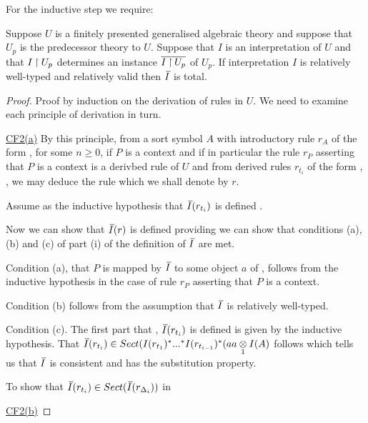 For the inductive step we require:
\begin{lemma}
Suppose $U$ is a finitely presented generalised algebraic theory and 
suppose that $U_p$ is the predecessor theory to $U$. Suppose that $I$ is an interpretation of $U$  and that  $I \mathbin{\restriction} U_p$  
determines an instance $\overline{I \mathbin{\restriction} U_p}$ of $U_p$.
If interpretation $I$ is relatively well-typed and relatively valid then $\Ibar$ is total.
\end{lemma}
\begin{proof} 
Proof by induction on the derivation of rules in $U$. We need to examine each principle of derivation in turn.

\underline{CF2(a)}
By this principle, from a sort symbol $A$ with introductory rule $r_A$ of the form , for some $n \geq 0$, if
$P$ is a context and if in particular the rule $r_P$ asserting that $P$ is a context is a derivbed rule of $U$
and from derived rules $r_{t_i}$ of the form , \foreachi, we may deduce
the rule  which we shall denote by $r$. 

\noindent Assume as the inductive hypothesis that $\Ibar(r_{t_i})$ is defined \foreachi.

\noindent Now we can show that $\Ibar(r)$ is defined providing we can show that conditions (a), (b) and (c) of part (i) of the definition of $\Ibar$ are met. 

\noindent Condition (a), that $P$ is mapped by $\Ibar$ to some object $a$ of \catc, follows from the inductive hypothesis in the case of  rule $r_P$ asserting that $P$ is a context.  

\noindent Condition (b) follows from the assumption that $\Ibar$ is relatively well-typed.

\noindent  Condition (c). The first part that \foreachi, $\Ibar(r_{t_i})$ is defined is given by the inductive hypothesis. 
That $\Ibar(r_{t_i}) \in Sect(I(r_{t_1})^*...^*I(r_{t_{i-1}})^*(a \crossx{a}{I(A)}{1}$ follows 
which tells us that $\Ibar$ is consistent and has the substitution property.

To show that $\Ibar(r_{t_i}) \in Sect(\Ibar(r_{\Delta_i}))$ in \catcw {}
\hspace{1in}

\underline{CF2(b)}
\end{proof}

